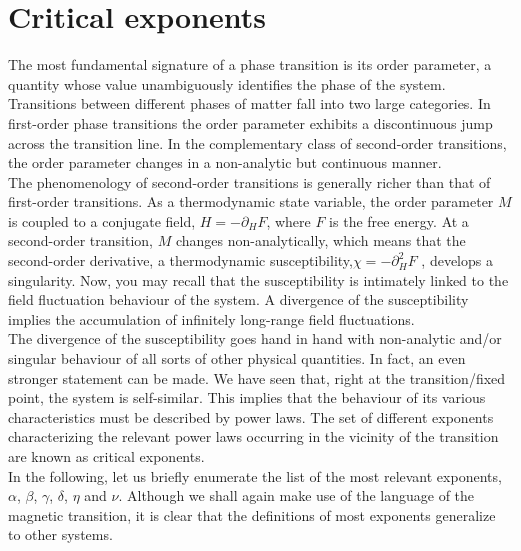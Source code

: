 \section{Critical exponents}
The most fundamental signature of a phase transition is its order parameter, a quantity whose value unambiguously identifies the phase of the system. Transitions between different phases of matter fall into two large categories. 
In first-order phase transitions the order parameter exhibits a discontinuous jump across the transition line.
In the complementary class of second-order transitions, the order parameter changes in a non-analytic but continuous manner.
\\ 
The phenomenology of second-order transitions is generally richer than that of first-order transitions. 
As a thermodynamic state variable, the order parameter $M$ is coupled to a conjugate field, $H = -\partial_H F$, where $F$ is the free energy. 
At a second-order transition, $M$ changes non-analytically, which means that the second-order derivative, a thermodynamic susceptibility,$\chi = -\partial_H^2 F$ , develops a singularity. 
Now, you may recall that the susceptibility is intimately linked to the field fluctuation behaviour of the system. A divergence of the susceptibility implies the accumulation of infinitely long-range field fluctuations.
\\
The divergence of the susceptibility goes hand in hand with non-analytic and/or singular behaviour of all sorts of other physical quantities. In fact, an even stronger statement can be made.
We have seen that, right at the transition/fixed point, the system is self-similar. This implies that the behaviour of its various characteristics must be described by power laws.
The set of different exponents characterizing the relevant power laws occurring in the vicinity of the transition are known as critical exponents.
\\
In the following, let us briefly enumerate the list of the most relevant exponents, $\alpha$, $\beta$, $\gamma$, $\delta$, $\eta$ and $\nu$. 
Although we shall again make use of the language of the magnetic transition, it is clear that the definitions of most exponents generalize to other systems.
